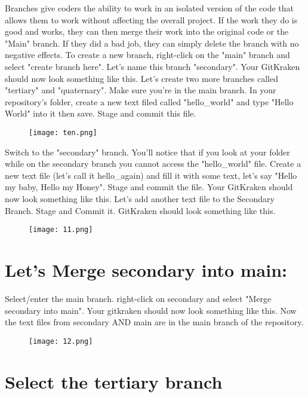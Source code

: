 \documentclass[10pt,twocolumn]{article}
\begin{document}
Branches give coders the ability to work in an isolated version of the code that allows them to work without affecting the overall project. If the work they do is good and works, they can then merge their work into the original code or the "Main" branch. If they did a bad job, they can simply delete the branch with no negative effects. To create a new branch, right-click on the "main" branch and select "create branch here". Let's name this branch "secondary". Your GitKraken should now look something like this. Let's create two more branches called "tertiary" and "quaternary". Make sure you're in the main branch. In your repository's folder, create a new text filed called "hello\_world" and type "Hello World" into it then save. Stage and commit this file.

\begin{figure}[htbp]
\centering
\texttt{[image: ten.png]}
\label{fig:my_label}
\end{figure}


Switch to the "secondary" branch. You'll notice that if you look at your folder while on the secondary branch you cannot access the "hello\_world" file. Create a new text file (let's call it hello\_again) and fill it with some text, let's say "Hello my baby, Hello my Honey". Stage and commit the file. Your GitKraken should now look something like this. Let's add another text file to the Secondary Branch. Stage and Commit it. GitKraken should look something like this.

\begin{figure}[htbp]
\centering
\texttt{[image: 11.png]}
\label{fig:my_label}
\end{figure}

\section{Let's Merge secondary into main:}

Select/enter the main branch. right-click on secondary and select "Merge secondary into main". Your gitkraken should now look something like this. Now the text files from secondary AND main are in the main branch of the repository.

\begin{figure}[htbp]
\centering
\texttt{[image: 12.png]}
\label{fig:my_label}
\end{figure}

\section{Select the tertiary branch}
\end{document}
